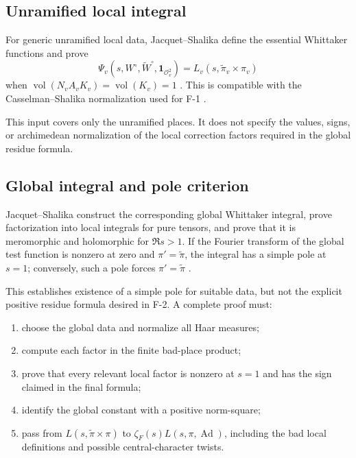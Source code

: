 \documentclass[12pt]{article}
\DeclareMathOperator{\Ad}{Ad}
\DeclareMathOperator{\vol}{vol}
\newcommand{\calO}{\mathcal{O}}
\begin{document}
\subsection{Unramified local integral}

For generic unramified local data, Jacquet--Shalika define the essential
Whittaker functions and prove
\[
  \Psi_v(s,W^\circ,\widetilde W^\circ,\mathbf{1}_{\calO_v^2})
  =L_v(s,\tilde\pi_v\times\pi_v)
\]
when $\vol(N_v A_v K_v)=\vol(K_v)=1$ \cite[Proposition~(2.3), pp.~511--512]{JS81}.
This is compatible with the Casselman--Shalika normalization used for F-1
\cite[Theorem~5.4, p.~227]{CS80}.

This input covers only the unramified places.  It does not specify the values,
signs, or archimedean normalization of the local correction factors required in
the global residue formula.

\subsection{Global integral and pole criterion}

Jacquet--Shalika construct the corresponding global Whittaker integral, prove
factorization into local integrals for pure tensors, and prove that it is
meromorphic and holomorphic for $\Re s>1$.  If the Fourier transform of the
global test function is nonzero at zero and $\pi'=\tilde\pi$, the integral has a
simple pole at $s=1$; conversely, such a pole forces $\pi'=\tilde\pi$
\cite[Section~4.5--4.7, especially Lemma~(4.6), pp.~550--552]{JS81}.

This establishes existence of a simple pole for suitable data, but not the
explicit positive residue formula desired in F-2.  A complete proof must:
\begin{enumerate}
  \item choose the global data and normalize all Haar measures;
  \item compute each factor in the finite bad-place product;
  \item prove that every relevant local factor is nonzero at $s=1$ and has the
        sign claimed in the final formula;
  \item identify the global constant with a positive norm-square;
  \item pass from $L(s,\tilde\pi\times\pi)$ to $\zeta_F(s)L(s,\pi,\Ad)$,
        including the bad local definitions and possible central-character
        twists.
\end{enumerate}
\end{document}
